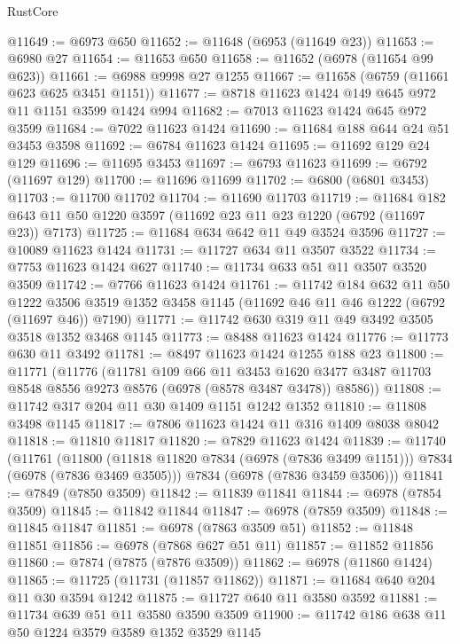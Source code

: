 \begin{lexlean}{RustCore}
\begin{coremodule}
@11649 := @6973 @650
@11652 := @11648 (@6953 (@11649 @23))
@11653 := @6980 @27
@11654 := @11653 @650
@11658 := @11652 (@6978 (@11654 @99 @623))
@11661 := @6988 @9998 @27 @1255
@11667 := @11658 (@6759 (@11661 @623 @625 @3451 @1151))
@11677 := @8718 @11623 @1424 @149 @645 @972 @11 @1151 @3599 @1424 @994
@11682 := @7013 @11623 @1424 @645 @972 @3599
@11684 := @7022 @11623 @1424
@11690 := @11684 @188 @644 @24 @51 @3453 @3598
@11692 := @6784 @11623 @1424
@11695 := @11692 @129 @24 @129
@11696 := @11695 @3453
@11697 := @6793 @11623
@11699 := @6792 (@11697 @129)
@11700 := @11696 @11699
@11702 := @6800 (@6801 @3453)
@11703 := @11700 @11702
@11704 := @11690 @11703
@11719 := @11684 @182 @643 @11 @50 @1220 @3597 (@11692 @23 @11 @23 @1220 (@6792 (@11697 @23)) @7173)
@11725 := @11684 @634 @642 @11 @49 @3524 @3596
@11727 := @10089 @11623 @1424
@11731 := @11727 @634 @11 @3507 @3522
@11734 := @7753 @11623 @1424 @627
@11740 := @11734 @633 @51 @11 @3507 @3520 @3509
@11742 := @7766 @11623 @1424
@11761 := @11742
    @184
    @632
    @11
    @50
    @1222
    @3506
    @3519
    @1352
    @3458
    @1145
    (@11692 @46 @11 @46 @1222 (@6792 (@11697 @46)) @7190)
@11771 := @11742 @630 @319 @11 @49 @3492 @3505 @3518 @1352 @3468 @1145
@11773 := @8488 @11623 @1424
@11776 := @11773 @630 @11 @3492
@11781 := @8497 @11623 @1424 @1255 @188 @23
@11800 := @11771
    (@11776
      (@11781
        @109
        @66
        @11
        @3453
        @1620
        @3477
        @3487
        @11703
        @8548
        @8556
        @9273
        @8576
        (@6978 (@8578 @3487 @3478))
        @8586))
@11808 := @11742 @317 @204 @11 @30 @1409 @1151 @1242 @1352
@11810 := @11808 @3498 @1145
@11817 := @7806 @11623 @1424 @11 @316 @1409 @8038 @8042
@11818 := @11810 @11817
@11820 := @7829 @11623 @1424
@11839 := @11740
    (@11761
      (@11800 (@11818 @11820 @7834 (@6978 (@7836 @3499 @1151))) @7834 (@6978 (@7836 @3469 @3505)))
      @7834
      (@6978 (@7836 @3459 @3506)))
@11841 := @7849 (@7850 @3509)
@11842 := @11839 @11841
@11844 := @6978 (@7854 @3509)
@11845 := @11842 @11844
@11847 := @6978 (@7859 @3509)
@11848 := @11845 @11847
@11851 := @6978 (@7863 @3509 @51)
@11852 := @11848 @11851
@11856 := @6978 (@7868 @627 @51 @11)
@11857 := @11852 @11856
@11860 := @7874 (@7875 (@7876 @3509))
@11862 := @6978 (@11860 @1424)
@11865 := @11725 (@11731 (@11857 @11862))
@11871 := @11684 @640 @204 @11 @30 @3594 @1242
@11875 := @11727 @640 @11 @3580 @3592
@11881 := @11734 @639 @51 @11 @3580 @3590 @3509
@11900 := @11742
    @186
    @638
    @11
    @50
    @1224
    @3579
    @3589
    @1352
    @3529
    @1145

\end{coremodule}
\end{lexlean}

